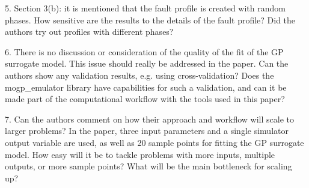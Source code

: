 \documentclass{article}
\begin{document}
\begin{enumerate}
5. Section 3(b): it is mentioned that the fault profile is created with random phases. How sensitive are the results to the details of the fault profile? Did the authors try out profiles with different phases?

6. There is no discussion or consideration of the quality of the fit of the GP surrogate model. This issue should really be addressed in the paper. Can the authors show any validation results, e.g. using cross-validation? Does the mogp\_emulator library have capabilities for such a validation, and can it be made part of the computational workflow with the tools used in this paper?

7. Can the authors comment on how their approach and workflow will scale to larger problems? In the paper, three input parameters and a single simulator output variable are used, as well as 20 sample points for fitting the GP surrogate model. How easy will it be to tackle problems with more inputs, multiple outputs, or more sample points? What will be the main bottleneck for scaling up?

\end{enumerate}
\end{document}
